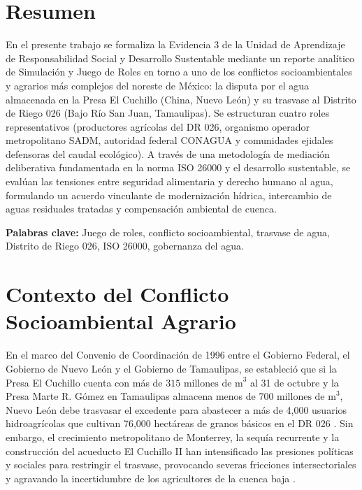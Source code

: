 \documentclass[spanish,letterpaper,oneside]{article}
\begin{document}
\hypersetup{pageanchor=false}
\begingroup
\fontsize{14}{17}\selectfont
\renewcommand{\Huge}{\fontsize{14}{17}\selectfont\bfseries}
\renewcommand{\large}{\fontsize{14}{17}\selectfont}
\templatePortrait
\clearpage
\endgroup
\hypersetup{pageanchor=true}
\templatePagecfg
\singlespacing
\setlength{\tabcolsep}{8pt}
\renewcommand{\arraystretch}{1.18}

\section*{Resumen}
En el presente trabajo se formaliza la Evidencia 3 de la Unidad de Aprendizaje de Responsabilidad Social y Desarrollo Sustentable mediante un reporte analítico de Simulación y Juego de Roles en torno a uno de los conflictos socioambientales y agrarios más complejos del noreste de México: la disputa por el agua almacenada en la Presa El Cuchillo (China, Nuevo León) y su trasvase al Distrito de Riego 026 (Bajo Río San Juan, Tamaulipas). Se estructuran cuatro roles representativos (productores agrícolas del DR 026, organismo operador metropolitano SADM, autoridad federal CONAGUA y comunidades ejidales defensoras del caudal ecológico). A través de una metodología de mediación deliberativa fundamentada en la norma ISO 26000 y el desarrollo sustentable, se evalúan las tensiones entre seguridad alimentaria y derecho humano al agua, formulando un acuerdo vinculante de modernización hídrica, intercambio de aguas residuales tratadas y compensación ambiental de cuenca.

\vspace{0.4cm}
\noindent\textbf{Palabras clave:} Juego de roles, conflicto socioambiental, trasvase de agua, Distrito de Riego 026, ISO 26000, gobernanza del agua.

\section{Contexto del Conflicto Socioambiental Agrario}
En el marco del Convenio de Coordinación de 1996 entre el Gobierno Federal, el Gobierno de Nuevo León y el Gobierno de Tamaulipas, se estableció que si la Presa El Cuchillo cuenta con más de $315\text{ millones de m}^3$ al 31 de octubre y la Presa Marte R. Gómez en Tamaulipas almacena menos de $700\text{ millones de m}^3$, Nuevo León debe trasvasar el excedente para abastecer a más de 4,000 usuarios hidroagrícolas que cultivan 76,000 hectáreas de granos básicos en el DR 026 \parencite{conagua2023}.
Sin embargo, el crecimiento metropolitano de Monterrey, la sequía recurrente y la construcción del acueducto El Cuchillo II han intensificado las presiones políticas y sociales para restringir el trasvase, provocando severas fricciones intersectoriales y agravando la incertidumbre de los agricultores de la cuenca baja \parencite{cantu2016}.
\end{document}
